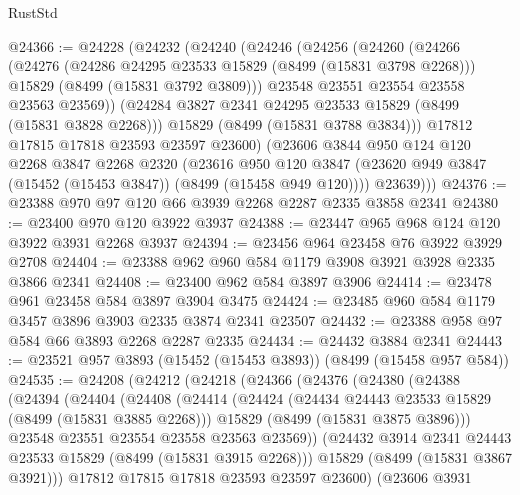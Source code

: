 \begin{lexlean}{RustStd}
\begin{coremodule}
@24366 := @24228
    (@24232
      (@24240
        (@24246
          (@24256
            (@24260
              (@24266
                (@24276
                  (@24286 @24295 @23533 @15829 (@8499 (@15831 @3798 @2268)))
                  @15829
                  (@8499 (@15831 @3792 @3809)))
                @23548
                @23551
                @23554
                @23558
                @23563
                @23569))
            (@24284 @3827 @2341 @24295 @23533 @15829 (@8499 (@15831 @3828 @2268)))
            @15829
            (@8499 (@15831 @3788 @3834)))
          @17812
          @17815
          @17818
          @23593
          @23597
          @23600)
        (@23606
          @3844
          @950
          @124
          @120
          @2268
          @3847
          @2268
          @2320
          (@23616
            @950
            @120
            @3847
            (@23620 @949 @3847 (@15452 (@15453 @3847)) (@8499 (@15458 @949 @120))))
          @23639)))
@24376 := @23388 @970 @97 @120 @66 @3939 @2268 @2287 @2335 @3858 @2341
@24380 := @23400 @970 @120 @3922 @3937
@24388 := @23447 @965 @968 @124 @120 @3922 @3931 @2268 @3937
@24394 := @23456 @964 @23458 @76 @3922 @3929 @2708
@24404 := @23388 @962 @960 @584 @1179 @3908 @3921 @3928 @2335 @3866 @2341
@24408 := @23400 @962 @584 @3897 @3906
@24414 := @23478 @961 @23458 @584 @3897 @3904 @3475
@24424 := @23485 @960 @584 @1179 @3457 @3896 @3903 @2335 @3874 @2341 @23507
@24432 := @23388 @958 @97 @584 @66 @3893 @2268 @2287 @2335
@24434 := @24432 @3884 @2341
@24443 := @23521 @957 @3893 (@15452 (@15453 @3893)) (@8499 (@15458 @957 @584))
@24535 := @24208
    (@24212
      (@24218
        (@24366
          (@24376
            (@24380
              (@24388
                (@24394
                  (@24404
                    (@24408
                      (@24414
                        (@24424
                          (@24434 @24443 @23533 @15829 (@8499 (@15831 @3885 @2268)))
                          @15829
                          (@8499 (@15831 @3875 @3896)))
                        @23548
                        @23551
                        @23554
                        @23558
                        @23563
                        @23569))
                    (@24432 @3914 @2341 @24443 @23533 @15829 (@8499 (@15831 @3915 @2268)))
                    @15829
                    (@8499 (@15831 @3867 @3921)))
                  @17812
                  @17815
                  @17818
                  @23593
                  @23597
                  @23600)
                (@23606
                  @3931

\end{coremodule}
\end{lexlean}
